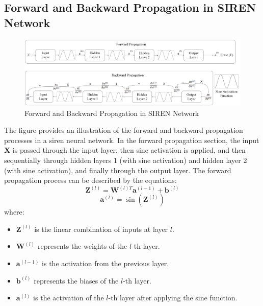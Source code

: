 \documentclass{ioereport}
\begin{document}
\subsection{Forward and Backward Propagation in SIREN Network}
\begin{figure}[H]
    \centering
    \includegraphics[width=\linewidth]{assets/Propagation concept figure Major Project.png}
    \caption{Forward and Backward Propagation in SIREN Network}
    \label{fig:propagation-diagram}
\end{figure}

The figure provides an illustration of the forward and backward propagation processes in a \gls{siren} neural network. In the forward propagation section, the input \( \mathbf{X} \) is passed through the input layer, then sine activation is applied, and then sequentially through hidden layers 1 (with sine activation) and hidden layer 2 (with sine activation), and finally through the output layer. The forward propagation process can be described by the equations:
\begin{equation}
    \mathbf{Z}^{(l)} = \mathbf{W}^{(l)T} \mathbf{a}^{(l-1)} + \mathbf{b}^{(l)}
\end{equation}
\begin{equation}
    \mathbf{a}^{(l)} = \sin(\mathbf{Z}^{(l)})
\end{equation}
where:
\begin{itemize}
    \item \( \mathbf{Z}^{(l)} \) is the linear combination of inputs at layer \( l \).
    \item \( \mathbf{W}^{(l)} \) represents the weights of the \( l \)-th layer.
    \item \( \mathbf{a}^{(l-1)} \) is the activation from the previous layer.
    \item \( \mathbf{b}^{(l)} \) represents the biases of the \( l \)-th layer.
    \item \( \mathbf{a}^{(l)} \) is the activation of the \( l \)-th layer after applying the sine function.
\end{itemize}
\end{document}

